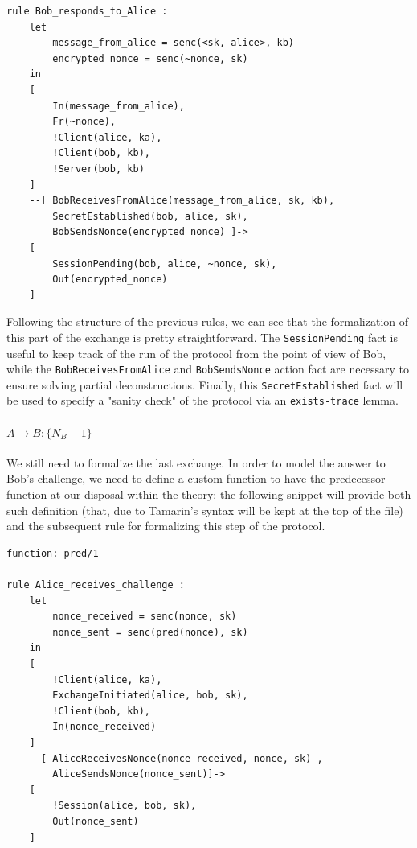 \documentclass[fleqn,10pt]{SelfArx} %
\newcounter{definition}[section]\setcounter{definition}{0}
\begin{document}
\begin{lstlisting}[language=Tamarin]
rule Bob_responds_to_Alice :
    let
        message_from_alice = senc(<sk, alice>, kb)
        encrypted_nonce = senc(~nonce, sk)
    in
    [
        In(message_from_alice),
        Fr(~nonce),
        !Client(alice, ka),
        !Client(bob, kb),
        !Server(bob, kb)
    ]
    --[ BobReceivesFromAlice(message_from_alice, sk, kb),
        SecretEstablished(bob, alice, sk),
        BobSendsNonce(encrypted_nonce) ]->
    [
        SessionPending(bob, alice, ~nonce, sk),
        Out(encrypted_nonce)
    ]
\end{lstlisting}

Following the structure of the previous rules, we can see that the formalization of this part of the exchange is pretty straightforward. The \lstinline|SessionPending| fact is useful to keep track of the run of the protocol from the point of view of Bob, while the \lstinline|BobReceivesFromAlice| and \lstinline|BobSendsNonce| action fact are necessary to ensure solving partial deconstructions. Finally, this \lstinline|SecretEstablished| fact will be used to specify a "sanity check" of the protocol via an \lstinline|exists-trace| lemma.

\paragraph{$A \to B: \{N_B - 1\}$}

We still need to formalize the last exchange. In order to model the answer to Bob's challenge, we need to define a custom function to have the predecessor function at our disposal within the theory: the following snippet will provide both such definition (that, due to Tamarin's syntax will be kept at the top of the file) and the subsequent rule for formalizing this step of the protocol.

\begin{lstlisting}[language=Tamarin]
function: pred/1

rule Alice_receives_challenge :
    let
        nonce_received = senc(nonce, sk)
        nonce_sent = senc(pred(nonce), sk)
    in
    [
        !Client(alice, ka),
        ExchangeInitiated(alice, bob, sk),
        !Client(bob, kb),
        In(nonce_received)
    ]
    --[ AliceReceivesNonce(nonce_received, nonce, sk) ,
        AliceSendsNonce(nonce_sent)]->
    [
        !Session(alice, bob, sk),
        Out(nonce_sent)
    ]
\end{lstlisting}
\end{document}
